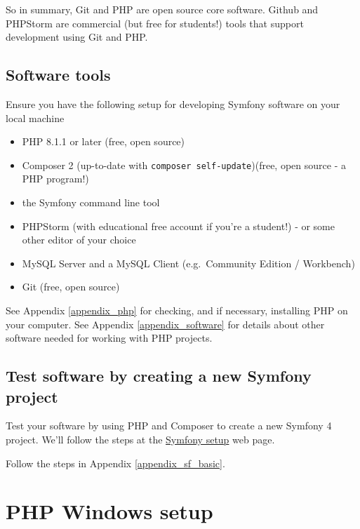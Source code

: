 \documentclass[a4paperpaper,openright]{book}
\providecommand{\tightlist}{%
  \setlength{\itemsep}{0pt}\setlength{\parskip}{0pt}}
\begin{document}
So in summary, Git and PHP are open source core software. Github and
PHPStorm are commercial (but free for students!) tools that support
development using Git and PHP.

\hypertarget{software-tools}{%
\section{Software tools}\label{software-tools}}

Ensure you have the following setup for developing Symfony software on
your local machine

\begin{itemize}
\tightlist
\item
  PHP 8.1.1 or later (free, open source)
\item
  Composer 2 (up-to-date with \texttt{composer\ self-update})(free, open
  source - a PHP program!)
\item
  the Symfony command line tool
\item
  PHPStorm (with educational free account if you're a student!) - or
  some other editor of your choice
\item
  MySQL Server and a MySQL Client (e.g.~Community Edition / Workbench)
\item
  Git (free, open source)
\end{itemize}

See Appendix \ref{appendix_php} for checking, and if necessary,
installing PHP on your computer. See Appendix \ref{appendix_software}
for details about other software needed for working with PHP projects.

\hypertarget{test-software-by-creating-a-new-symfony-project}{%
\section{Test software by creating a new Symfony
project}\label{test-software-by-creating-a-new-symfony-project}}

Test your software by using PHP and Composer to create a new Symfony 4
project. We'll follow the steps at the
\href{https://symfony.com/doc/current/setup.html}{Symfony setup} web
page.

Follow the steps in Appendix \ref{appendix_sf_basic}.

\hypertarget{php-windows-setup}{%
\chapter{\texorpdfstring{PHP Windows
setup\label{appendix_php}}{PHP Windows setup}}\label{php-windows-setup}}
\end{document}
